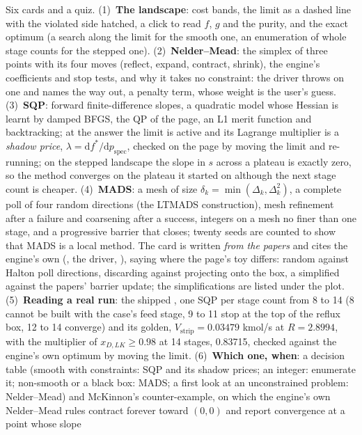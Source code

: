 \documentclass[11pt,a4paper]{article}
\begin{document}
Six cards and a quiz.  (1)~\textbf{The landscape}: cost bands, the limit as a
dashed line with the violated side hatched, a click to read $f$, $g$ and the
purity, and the exact optimum (a search along the limit for the smooth one, an
enumeration of whole stage counts for the stepped one).  (2)~\textbf{Nelder--Mead}:
the simplex of three points with its four moves (reflect, expand, contract,
shrink), the engine's coefficients and stop tests, and why it takes no
constraint: the driver throws on one and names the way out, a penalty term,
whose weight is the user's guess.  (3)~\textbf{SQP}: forward finite-difference
slopes, a quadratic model whose Hessian is learnt by damped BFGS, the QP of
the  page, an L1 merit function and backtracking; at the
answer the limit is active and its Lagrange multiplier is a \emph{shadow
price}, $\lambda=\mathrm{d}f^{*}/\mathrm{d}p_\mathrm{spec}$, checked on the page
by moving the limit and re-running; on the stepped landscape the slope in
$s$ across a plateau is exactly zero, so the method converges on the plateau
it started on although the next stage count is cheaper.  (4)~\textbf{MADS}:
a mesh of size $\delta_k=\min(\Delta_k,\Delta_k^2)$, a complete poll of four
random directions (the LTMADS construction), mesh refinement after a failure
and coarsening after a success, integers on a mesh no finer than one stage,
and a progressive barrier that closes; twenty seeds are counted to show that
MADS is a local method.  The card is written \emph{from the papers} and cites the engine's own
 (, the driver, ), saying where the
page's toy differs: random against Halton poll directions, discarding against projecting onto the box, a simplified
against the papers' barrier update; the simplifications are listed under the plot.  (5)~\textbf{Reading a real run}:
the shipped , one SQP per stage count from 8 to
14 (8 cannot be built with the case's feed stage, 9 to 11 stop at the top of
the reflux box, 12 to 14 converge) and its golden, $V_\mathrm{strip}=0.03479$
kmol/s at $R=2.8994$, with the multiplier of $x_{D,LK}\ge0.98$ at 14 stages,
0.83715, checked against the engine's own optimum by moving the limit.
(6)~\textbf{Which one, when}: a decision table (smooth with constraints:
SQP and its shadow prices; an integer: enumerate it; non-smooth or a black
box: MADS; a first look at an unconstrained problem: Nelder--Mead) and
McKinnon's counter-example, on which the engine's own Nelder--Mead rules
contract forever toward $(0,0)$ and report convergence at a point whose slope
\end{document}
